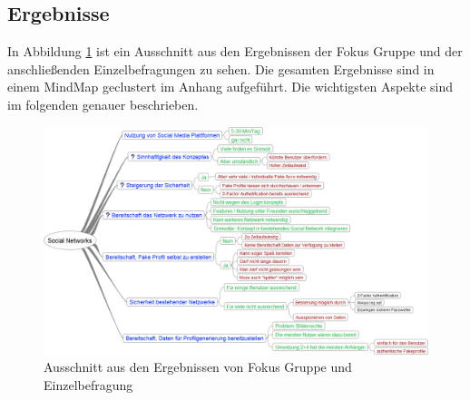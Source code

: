 \documentclass{sigchi}
\begin{document}
\subsection{Ergebnisse}
\label{Ergebnisse}
In Abbildung \ref{fig:MindMap2} ist ein Ausschnitt aus den Ergebnissen der Fokus Gruppe und der anschließenden Einzelbefragungen zu sehen. Die gesamten Ergebnisse sind in einem MindMap geclustert im Anhang aufgeführt. Die wichtigsten Aspekte sind im folgenden genauer beschrieben. 
\begin{figure}[htbp]
	\includegraphics[width=0.8\columnwidth]{figures/Social-Networks_2.png}
	\caption{Ausschnitt aus den Ergebnissen von Fokus Gruppe und Einzelbefragung}
	\label{fig:MindMap2}
\end{figure}
\end{document}
